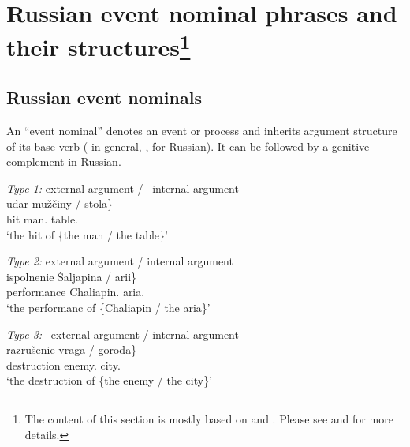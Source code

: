 \documentclass[output=paper,
]{langscibook}
\begin{document}
\section[Russian event nominal phrases and their structures]{Russian event nominal phrases and their structures\label{sec:EVN}\protect\footnote{The content of this section is mostly based on \cite{MiyauchiIto2016} and \cite{Miyauchi2017b}. Please see \cite{MiyauchiIto2016} and \cite{Miyauchi2017b} for more details.}} 

\subsection{Russian event nominals}

An ``event nominal'' denotes an event or process and inherits argument structure of its base verb (\citealt{Grimshaw1990} in general, \citealt{Schoorlemmer1998}, \citealt{Pazelskaya2007} for Russian). 
It can be followed by a genitive complement in Russian.

\begin{exe}\ex \label{type}%
\begin{xlist}
\ex \label{type1}
\textit{Type 1:}  external argument / \ internal argument\\\samepage
\gll	udar \minsp{\{} {mužčiny} / \minsp{*} {stola}\}\\
		hit {} man.{\GEN} {} {} table.{\GEN}\\
\trans `the hit of \{the man / the table\}'

\ex \label{type2}
\textit{Type 2:}  external argument /  internal argument\\
\gll	ispolnenie \minsp{\{} {Šaljapina} / {arii}\}\\
		performance {} Chaliapin.{\GEN} {} aria.{\GEN}\\
\trans `the performanc of \{Chaliapin / the aria\}'\samepage

\ex \label{type3}
\textit{Type 3:} \ external argument /  internal argument\\
\gll	razrušenie \minsp{\{*} {vraga} / {goroda}\}\\
		destruction {} enemy.{\GEN} {} city.{\GEN}\\
\trans `the destruction of \{the enemy / the city\}'
\end{xlist}
\end{exe}
\end{document}
